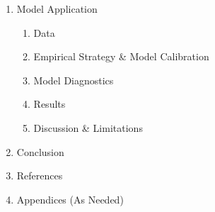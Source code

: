 \documentclass[11pt]{article}
\begin{document}
\begin{enumerate}
	\item Model Application
	\begin{enumerate}
		\item Data
		\item Empirical Strategy \& Model Calibration
		\item Model Diagnostics
		\item Results
		\item Discussion \& Limitations
	\end{enumerate}
	\item Conclusion
	\item References
	\item Appendices (As Needed)
\end{enumerate}

\newpage















\end{document}
